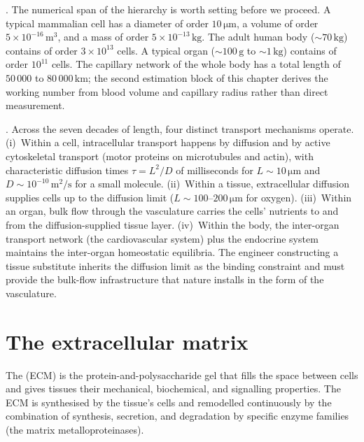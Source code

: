 

. The numerical span of the hierarchy is
worth setting before we proceed. A typical mammalian cell has a
diameter of order $10\,\si{\micro\meter}$, a volume of order
$5 \times 10^{-16}\,\text{m}^3$, and a mass of order
$5 \times 10^{-13}\,\text{kg}$. The adult human body
($\sim 70\,\text{kg}$) contains of order $3 \times 10^{13}$ cells.
A typical organ ($\sim 100\,\text{g}$ to $\sim 1\,\text{kg}$)
contains of order $10^{11}$ cells. The capillary network of the
whole body has a total length of $50\,000$ to $80\,000\,\text{km}$;
the second estimation block of this chapter derives the working number
from blood volume and capillary radius rather than direct
measurement.

. Across the seven decades
of length, four distinct transport mechanisms operate. (i)~Within a
cell, intracellular transport happens by diffusion and by active
cytoskeletal transport (motor proteins on microtubules and actin),
with characteristic diffusion times $\tau = L^2/D$ of milliseconds
for $L \sim 10\,\si{\micro\meter}$ and $D \sim
10^{-10}\,\text{m}^2/\text{s}$ for a small molecule. (ii)~Within a
tissue, extracellular diffusion supplies cells up to the diffusion
limit ($L \sim 100$--$200\,\si{\micro\meter}$ for oxygen). (iii)~Within
an organ, bulk flow through the vasculature carries the cells'
nutrients to and from the diffusion-supplied tissue layer. (iv)~Within
the body, the inter-organ transport network (the cardiovascular
system) plus the endocrine system maintains the inter-organ
homeostatic equilibria. The engineer constructing a tissue substitute
inherits the diffusion limit as the binding constraint and must
provide the bulk-flow infrastructure that nature installs in the
form of the vasculature.

\section{The extracellular matrix}

The  (ECM) is the protein-and-polysaccharide
gel that fills the space between cells and gives tissues their
mechanical, biochemical, and signalling properties. The ECM is
synthesised by the tissue's cells and remodelled continuously by the
combination of synthesis, secretion, and degradation by specific
enzyme families (the matrix metalloproteinases).


